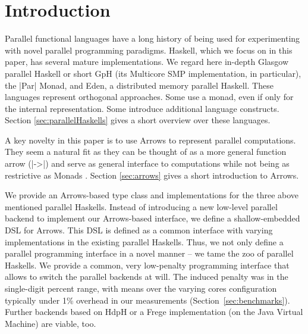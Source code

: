 
\section{Introduction}
\label{sec:introduction}

Parallel functional languages have a long history of being used for experimenting with novel parallel programming paradigms. Haskell, which we focus on in this paper, has  several mature implementations. We regard here in-depth
Glasgow parallel Haskell or short GpH (its Multicore SMP implementation, in particular), the
|Par| Monad, and Eden, a distributed memory parallel Haskell. These
languages represent orthogonal approaches. Some use a monad, even if
only for the internal representation. Some introduce additional
language constructs. Section \ref{sec:parallelHaskells} gives a short overview over these languages.

A key novelty in this paper is to use Arrows to represent parallel computations. They seem a natural fit as they can be thought of as a more general function arrow (|->|) and serve as general interface to computations while not being as restrictive as Monads \citep{HughesArrows}. Section \ref{sec:arrows} gives a short introduction to Arrows.

We provide an Arrows-based type class and implementations for the three above mentioned parallel Haskells.
Instead of 
introducing a new low-level parallel backend to implement our
Arrows-based interface, we define a shallow-embedded DSL for Arrows. This DSL
is defined as a common interface with varying implementations in
the existing parallel Haskells. Thus, we not only define a parallel programming interface in a
novel manner -- we tame the zoo of parallel Haskells. We provide a
common, very low-penalty programming interface that allows to switch
the parallel backends at will. The induced penalty was in the single-digit percent range, with means over the varying cores configuration typically under 1\% overhead in our measurements (Section~\ref{sec:benchmarks}). Further backends based on HdpH or a Frege implementation (on the Java Virtual Machine) are viable, too.

